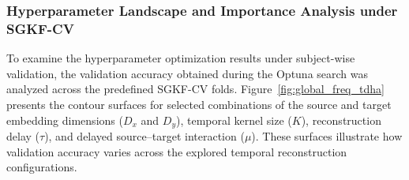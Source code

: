 \subsubsection{Hyperparameter Landscape and Importance Analysis under SGKF-CV}

To examine the hyperparameter optimization results under subject-wise validation, the validation accuracy obtained during the Optuna search was analyzed across the predefined SGKF-CV folds. Figure~\ref{fig:global_freq_tdha} presents the contour surfaces for selected combinations of the source and target embedding dimensions ($D_x$ and $D_y$), temporal kernel size ($K$), reconstruction delay ($\tau$), and delayed source--target interaction ($\mu$). These surfaces illustrate how validation accuracy varies across the explored temporal reconstruction configurations.
